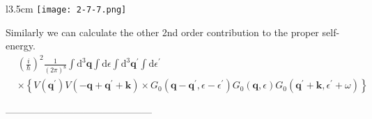 \begin{wrapfigure}[4]{l}{3.5cm}
\label{Fig2.7.7} \texttt{[image: 2-7-7.png]}
\end{wrapfigure}
Similarly we can calculate the other 2nd order contribution to the proper self-energy.
\[ \begin{split} & \left(\frac{i}{\hbar}\right)^2 \frac{1}{(2\pi)^8} \int \mathrm{d}^3 \mathbf{q} \int \mathrm{d} \epsilon \int \mathrm{d}^3 \mathbf{q}^{'} \int \mathrm{d} \epsilon^{'}  \\
& \times \left\{ V(\mathbf{q}^{'})V(-\mathbf{q} + \mathbf{q}^{'}+\mathbf{k})
\times G_0(\mathbf{q}-\mathbf{q}^{'},\epsilon-\epsilon^{'})G_0(\mathbf{q},\epsilon)G_0(\mathbf{q}^{'}+\mathbf{k},\epsilon^{'}+\omega) \right\} \end{split}\]
\begin{center}---------------------------------------------\end{center}
